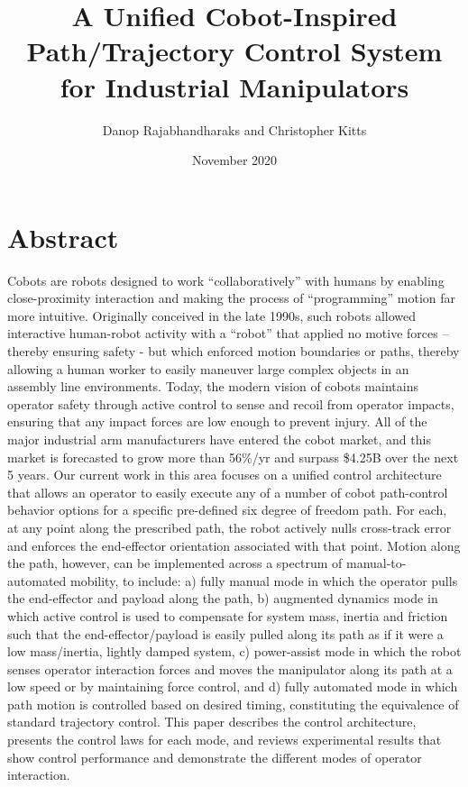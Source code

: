 \documentclass{article}
\title{A Unified Cobot-Inspired Path/Trajectory Control System for Industrial Manipulators}
\author{Danop Rajabhandharaks and Christopher Kitts}
\date{November 2020}
\begin{document}
\maketitle

\section{Abstract}
Cobots are robots designed to work “collaboratively” with humans by enabling close-proximity interaction and making the process of “programming” motion far more intuitive.  Originally conceived in the late 1990s, such robots allowed interactive human-robot activity with a “robot” that applied no motive forces – thereby ensuring safety - but which enforced motion boundaries or paths, thereby allowing a human worker to easily maneuver large complex objects in an assembly line environments. Today, the modern vision of cobots maintains operator safety through active control to sense and recoil from operator impacts, ensuring that any impact forces are low enough to prevent injury.  All of the major industrial arm manufacturers have entered the cobot market, and this market is forecasted to grow more than 56\%/yr and surpass \$4.25B over the next 5 years. Our current work in this area focuses on a unified control architecture that allows an operator to easily execute any of a number of cobot path-control behavior options for a specific pre-defined six degree of freedom path. For each, at any point along the prescribed path, the robot actively nulls cross-track error and enforces the end-effector orientation associated with that point. Motion along the path, however, can be implemented across a spectrum of manual-to-automated mobility, to include: a) fully manual mode in which the operator pulls the end-effector and payload along the path, b) augmented dynamics mode in which active control is used to compensate for system mass, inertia and friction such that the end-effector/payload is easily pulled along its path as if it were a low mass/inertia, lightly damped system, c) power-assist mode in which the robot senses operator interaction forces and moves the manipulator along its path at a low speed or by maintaining force control, and d) fully automated mode in which path motion is controlled based on desired timing, constituting the equivalence of standard trajectory control. This paper describes the control architecture, presents the control laws for each mode, and reviews experimental results that show control performance and demonstrate the different modes of operator interaction.
\end{document}
